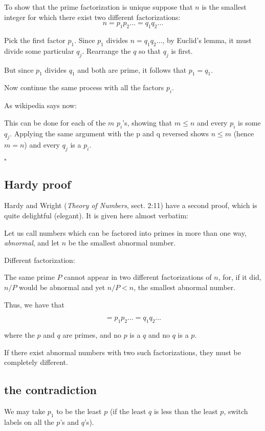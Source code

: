 \documentclass[11pt, oneside]{article}
\begin{document}
To show that the prime factorization is unique suppose that $n$ is the smallest integer for which there exist two different factorizations:
\[ n = p_1 p_2 \dots = q_1 q_2 \dots \]
    
Pick the first factor $p_1$.  Since $p_1$ divides $n = q_1 q_2 \dots$, by Euclid's lemma, it must divide some particular $q_j$.  Rearrange the $q$ so that $q_j$ is first.

But since $p_1$ divides $q_1$ and both are prime, it follows that $p_1 = q_1$. 

Now continue the same process with all the factors $p_i$.

As wikipedia says now:

    This can be done for each of the $m$ $p_i$'s, showing that $m \le n$ and every $p_i$ is some $q_j$. Applying the same argument with the p and q reversed shows $n \le m$ (hence $m = n$) and every $q_j$ is a $p_i$.
    
$\square$
    
\subsection*{Hardy proof}

Hardy and Wright (\emph{Theory of Numbers}, sect. 2:11) have a second proof, which is quite delightful (elegant).  It is given here almost verbatim:

    Let us call numbers which can be factored into primes in more than one way, \emph{abnormal}, and let $n$ be the smallest abnormal number.

Different factorization:

The same prime $P$ cannot appear in two different factorizations of $n$, for, if it did, $n/P$ would be abnormal and yet $n/P < n$, the smallest abnormal number.

Thus, we have that

\[  = p_1 p_2 \dots = q_1 q_2 \dots \]
    
where the $p$ and $q$ are primes, and no $p$ is a $q$ and no $q$ is a $p$.

If there exist abnormal numbers with two such factorizations, they must be completely different.

\subsection*{the contradiction}

We may take $p_1$ to be the least $p$ (if the least $q$ is less than the least $p$, switch labels on all the $p$'s and $q$'s).  
\end{document}
